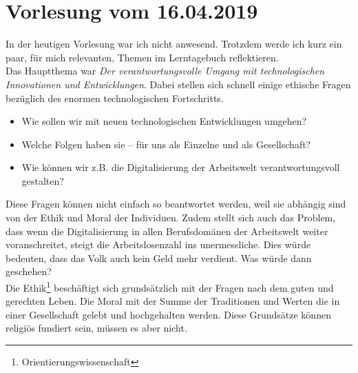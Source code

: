 \section{Vorlesung vom 16.04.2019}
In der heutigen Vorlesung war ich nicht anwesend. Trotzdem werde ich kurz ein paar, für mich relevanten, Themen im Lerntagebuch reflektieren.\\

Das Hauptthema war \textit{Der verantwortungsvolle Umgang mit technologischen Innovationen und Entwicklungen}. Dabei stellen sich schnell einige ethische Fragen bezüglich des enormen technologischen Fortschritts.\\

\begin{itemize}
	\item [ ] Wie sollen wir mit neuen technologischen Entwicklungen
umgehen?\\
	\item [ ] Welche Folgen haben sie – für uns als Einzelne und als
Gesellschaft?\\
	\item [ ] Wie können wir z.B. die Digitalisierung der Arbeitswelt
verantwortungsvoll gestalten?\\
\end{itemize}

Diese Fragen können nicht einfach so beantwortet werden, weil sie abhängig sind von der Ethik und Moral der Individuen. Zudem stellt sich auch das Problem, dass wenn die Digitalisierung in allen Berufsdomänen der Arbeitswelt weiter voranschreitet, steigt die Arbeitslosenzahl ins unermessliche. Dies würde bedeuten, dass das Volk auch kein Geld mehr verdient. Was würde dann geschehen?\\

Die Ethik\footnote{Orientierungswissenschaft} beschäftigt sich grundsätzlich mit der Fragen nach dem guten und gerechten Leben. Die Moral mit der Summe der Traditionen und Werten die in einer Gesellschaft gelebt und hochgehalten werden. Diese Grundsätze können religiös fundiert sein, müssen es aber nicht.\\

